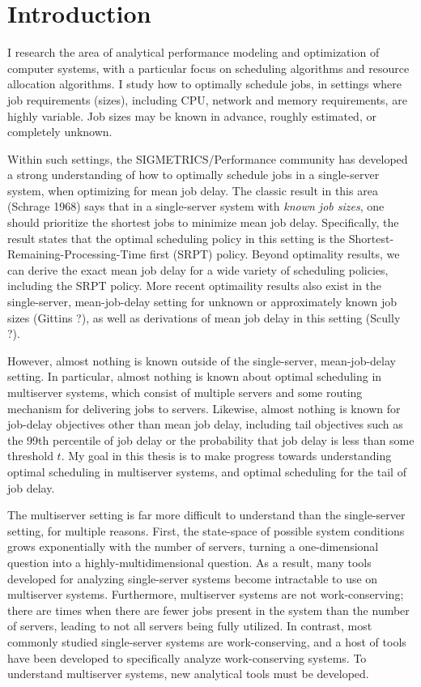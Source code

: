 \documentclass[12pt]{article}
\begin{document}
\section{Introduction}
I research the area of analytical performance modeling and optimization of computer systems,
with a particular focus on scheduling algorithms and resource allocation algorithms.
I study how to optimally schedule jobs,
in settings where job requirements (sizes),
including CPU, network and memory requirements,
are highly variable.
Job sizes may be known in advance,
roughly estimated,
or completely unknown.

Within such settings,
the SIGMETRICS/Performance community has developed a strong understanding
of how to optimally schedule jobs in a single-server system,
when optimizing for mean job delay.
The classic result in this area (Schrage 1968)
says that in a single-server system with \textit{known job sizes},
one should prioritize the shortest jobs to minimize mean job delay.
Specifically, the result states that the optimal scheduling policy in this setting
is the Shortest-Remaining-Processing-Time first (SRPT) policy.
Beyond optimality results,
we can derive the exact mean job delay for a wide variety of scheduling policies,
including the SRPT policy.
More recent optimaility results also exist in the single-server, mean-job-delay setting
for unknown or approximately known job sizes (Gittins ?),
as well as derivations of mean job delay in this setting (Scully ?).

However, almost nothing is known outside of the single-server, mean-job-delay setting.
In particular, almost nothing is known about optimal scheduling in multiserver systems,
which consist of multiple servers and some routing mechanism for delivering jobs to servers.
Likewise, almost nothing is known for job-delay objectives other than mean job delay,
including tail objectives such as the 99th percentile of job delay
or the probability that job delay is less than some threshold $t$.
My goal in this thesis is to make progress towards understanding optimal scheduling
in multiserver systems,
and optimal scheduling for the tail of job delay.

The multiserver setting is far more difficult to understand than the single-server setting,
for multiple reasons.
First, the state-space of possible system conditions grows exponentially
with the number of servers,
turning a one-dimensional question into a highly-multidimensional question.
As a result, many tools developed for analyzing single-server systems
become intractable to use on multiserver systems.
Furthermore, multiserver systems are not work-conserving;
there are times when there are fewer jobs present in the system than the number of servers,
leading to not all servers being fully utilized.
In contrast, most commonly studied single-server systems are work-conserving,
and a host of tools have been developed to specifically analyze work-conserving systems.
To understand multiserver systems, new analytical tools must be developed.
\end{document}
